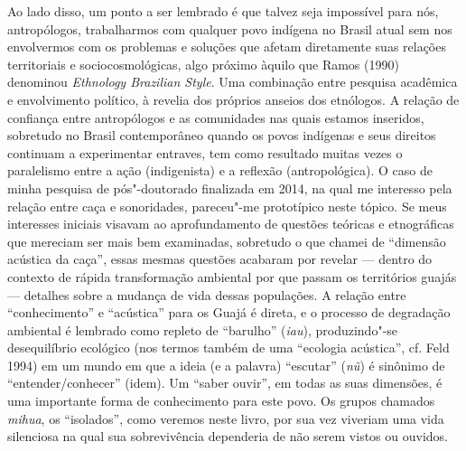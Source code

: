 Ao lado disso, um ponto a ser lembrado é que talvez seja impossível para
nós, antropólogos, trabalharmos com qualquer povo indígena no Brasil
atual sem nos envolvermos com os problemas e soluções que afetam
diretamente suas relações territoriais e sociocosmológicas, algo próximo
àquilo que Ramos (1990) denominou \emph{Ethnology Brazilian Style}.
Uma combinação entre pesquisa acadêmica e envolvimento político, à
revelia dos próprios anseios dos etnólogos. A relação de confiança entre
antropólogos e as comunidades nas quais estamos inseridos, sobretudo no
Brasil contemporâneo quando os povos indígenas e seus direitos continuam
a experimentar entraves, tem como resultado muitas vezes o paralelismo
entre a ação (indigenista) e a reflexão (antropológica). O caso de minha
pesquisa de pós"-doutorado finalizada em 2014, na qual me interesso pela
relação entre caça e sonoridades, pareceu"-me prototípico neste tópico.
Se meus interesses iniciais visavam ao aprofundamento de questões
teóricas e etnográficas que mereciam ser mais bem examinadas, sobretudo
o que chamei de ``dimensão acústica da caça'', essas mesmas questões
acabaram por revelar --- dentro do contexto de rápida transformação
ambiental por que passam os territórios guajás --- detalhes sobre a
mudança de vida dessas populações. A relação entre ``conhecimento'' e
``acústica'' para os Guajá é direta, e o processo de degradação ambiental
é lembrado como repleto de ``barulho'' (\emph{iau}), produzindo"-se
desequilíbrio ecológico (nos termos também de uma ``ecologia acústica'',
cf. Feld 1994) em um mundo em que a ideia (e a palavra) ``escutar''
(\emph{nũ}) é sinônimo de ``entender/conhecer'' (idem). Um ``saber
ouvir'', em todas as suas dimensões, é uma importante forma de
conhecimento para este povo. Os grupos chamados \emph{mihua}, os
``isolados'', como veremos neste livro, por sua vez viveriam uma vida
silenciosa na qual sua sobrevivência dependeria de não serem vistos ou
ouvidos.


